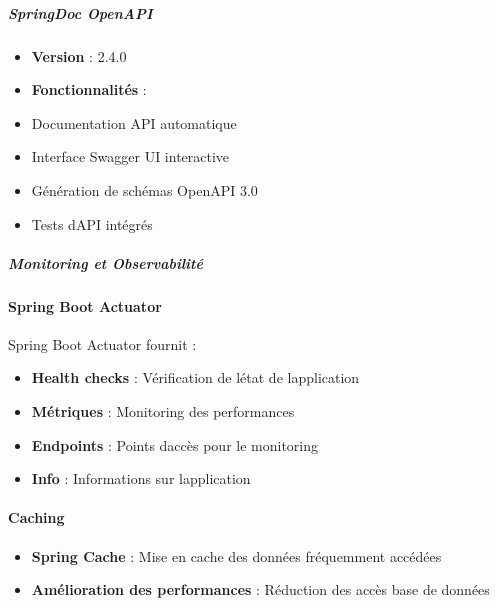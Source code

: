 \documentclass[12pt,a4paper,twoside]{report}
\begin{document}
\hypertarget{springdoc-openapi}{%
\subparagraph{SpringDoc OpenAPI}\label{springdoc-openapi}}

\begin{itemize}
\item
  \textbf{Version} : 2.4.0
\item
  \textbf{Fonctionnalités} :
\end{itemize}

\begin{itemize}
\item
  Documentation API automatique
\item
  Interface Swagger UI interactive
\item
  Génération de schémas OpenAPI 3.0
\item
  Tests d\textquotesingle API intégrés
\end{itemize}

\hypertarget{monitoring-et-observabilituxe9}{%
\subparagraph{Monitoring et
Observabilité}\label{monitoring-et-observabilituxe9}}

\hypertarget{spring-boot-actuator}{%
\paragraph{Spring Boot Actuator}\label{spring-boot-actuator}}

Spring Boot Actuator fournit :

\begin{itemize}
\item
  \textbf{Health checks} : Vérification de l\textquotesingle état de
  l\textquotesingle application
\item
  \textbf{Métriques} : Monitoring des performances
\item
  \textbf{Endpoints} : Points d\textquotesingle accès pour le monitoring
\item
  \textbf{Info} : Informations sur l\textquotesingle application
\end{itemize}

\hypertarget{caching}{%
\paragraph{Caching}\label{caching}}

\begin{itemize}
\item
  \textbf{Spring Cache} : Mise en cache des données fréquemment accédées
\item
  \textbf{Amélioration des performances} : Réduction des accès base de
  données
\end{itemize}
\end{document}
